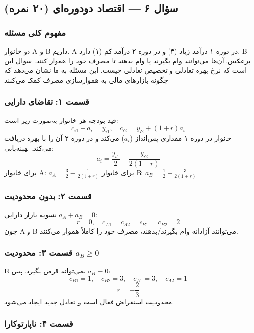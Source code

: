 \documentclass[12pt,a4paper]{article}
\begin{document}
\subsection{سؤال ۶ — اقتصاد دودوره‌ای (۲۰ نمره)}

\subsubsection*{مفهوم کلی مسئله}

دو خانوار A و B داریم. A در دوره ۱ درآمد زیاد (۳) و در دوره ۲ درآمد کم (۱) دارد. B برعکس. آن‌ها می‌توانند وام بگیرند یا وام بدهند تا مصرف خود را هموار کنند. سؤال این است که نرخ بهره تعادلی و تخصیص تعادلی چیست. این مسئله به ما نشان می‌دهد که چگونه بازارهای مالی به هموارسازی مصرف کمک می‌کنند.

\subsubsection*{قسمت ۱: تقاضای دارایی}

قید بودجه هر خانوار به‌صورت زیر است:
\[
	c_{i1} + a_i = y_{i1}, \quad c_{i2} = y_{i2} + (1 + r) a_i
\]
خانوار در دوره ۱ مقداری پس‌انداز ($a_i$) می‌کند و در دوره ۲ آن را با بهره دریافت می‌کند. بهینه‌یابی:
\[
	a_i = \frac{y_{i1}}{2} - \frac{y_{i2}}{2(1 + r)}
\]
برای خانوار A: $a_A = \frac{3}{2} - \frac{1}{2(1+r)}$
برای خانوار B: $a_B = \frac{1}{2} - \frac{3}{2(1+r)}$

\subsubsection*{قسمت ۲: بدون محدودیت}

تسویه بازار دارایی $a_A + a_B = 0$:
\[
	r = 0, \quad c_{A1} = c_{A2} = c_{B1} = c_{B2} = 2
\]
چون A و B می‌توانند آزادانه وام بگیرند/بدهند، مصرف خود را کاملاً هموار می‌کنند.

\subsubsection*{قسمت ۳: محدودیت $a_B \geq 0$}

B نمی‌تواند قرض بگیرد. پس $a_B = 0$:
\[
	c_{B1} = 1, \quad c_{B2} = 3, \quad c_{A1} = 3, \quad c_{A2} = 1
\]
\[
	r = -\frac{2}{3}
\]
محدودیت استقراض فعال است و تعادل جدید ایجاد می‌شود.

\subsubsection*{قسمت ۴: ناپارتوکارا}
\end{document}
